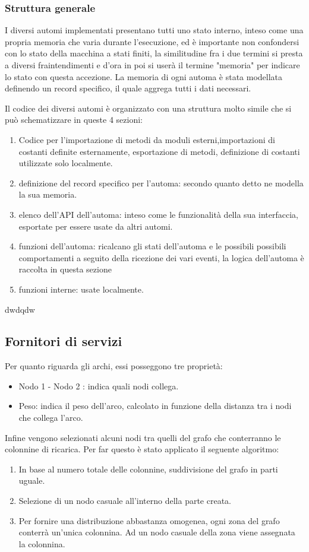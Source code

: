 \subsubsection{Struttura generale}
I diversi automi implementati presentano tutti uno stato interno, inteso come una propria memoria che varia durante l'esecuzione, ed è importante non confondersi con lo stato della macchina a stati finiti, la similitudine fra i due termini si presta a diversi fraintendimenti e d'ora in poi si userà il termine "memoria" per indicare lo stato con questa accezione. La memoria di ogni automa è stata modellata definendo un record specifico, il quale aggrega tutti i dati necessari.
 
Il codice dei diversi automi è organizzato con una struttura molto simile che si può schematizzare in queste 4 sezioni:

\begin{enumerate}
	\item Codice per l'importazione di metodi da moduli esterni,importazioni di costanti definite esternamente, esportazione di metodi, definizione di costanti utilizzate solo localmente.
	\item definizione del record specifico per l'automa: secondo quanto detto ne modella la sua memoria.
	\item elenco dell'API dell'automa: inteso come le funzionalità della sua interfaccia, esportate per essere usate da altri automi.
	\item funzioni dell'automa: ricalcano gli stati dell'automa e le possibili possibili comportamenti a seguito della ricezione dei vari eventi, la logica dell'automa è raccolta in questa sezione
	\item funzioni interne: usate localmente.
\end{enumerate}

dwdqdw

\subsection{Fornitori di servizi}
Per quanto riguarda gli archi, essi posseggono tre proprietà:
\begin{itemize}
	\item Nodo 1 - Nodo 2 : indica quali nodi collega.
	\item Peso: indica il peso dell'arco, calcolato in funzione della distanza tra i nodi che collega l'arco.
\end{itemize}

Infine vengono selezionati alcuni nodi tra quelli del grafo che conterranno le colonnine di ricarica. Per far questo è stato applicato il seguente algoritmo:
\begin{enumerate}
	\item In base al numero totale delle colonnine, suddivisione del grafo in parti uguale.
	\item Selezione di un nodo casuale all'interno della parte creata.
	\item Per fornire una distribuzione abbastanza omogenea, ogni zona del grafo conterrà un'unica colonnina. Ad un nodo casuale della zona viene assegnata la colonnina.
\end{enumerate}

